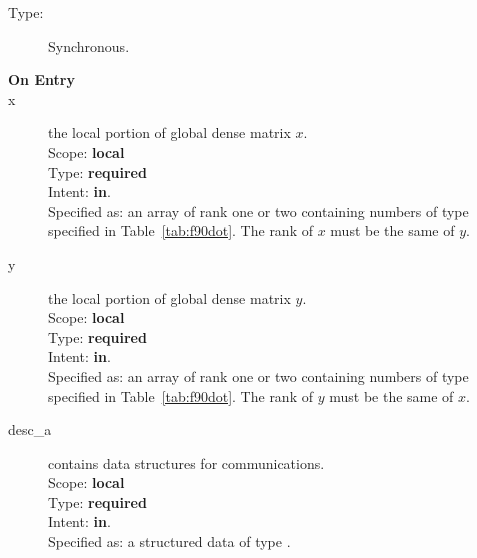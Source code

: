\begin{description}
\item[Type:] Synchronous.
\item[\bf On Entry]
\item[x] the local portion of global dense matrix
$x$.\\
Scope: {\bf local} \\
Type: {\bf required} \\
Intent: {\bf in}.\\
Specified as: an array of rank one or two
containing numbers of type specified in
Table~\ref{tab:f90dot}. The rank of $x$ must be the same of $y$. 
\item[y] the local portion of global dense matrix
$y$. \\
Scope: {\bf local} \\
Type: {\bf required} \\
Intent: {\bf in}.\\
Specified as: an array of rank one or two
containing numbers of type specified in
Table~\ref{tab:f90dot}. The rank of $y$ must be the same of $x$. 
\item[desc\_a] contains data structures for communications.\\
Scope: {\bf local} \\
Type: {\bf required}\\
Intent: {\bf in}.\\
Specified as: a structured data of type \descdata.


\end{description}
